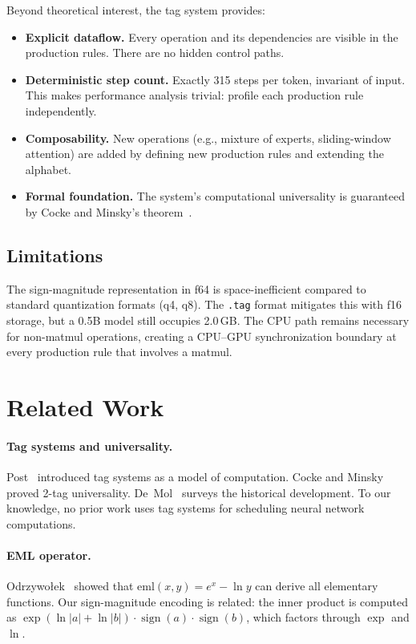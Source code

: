 \documentclass[acmsmall,nonacm]{acmart}
\begin{document}
Beyond theoretical interest, the tag system provides:
\begin{itemize}
\item \textbf{Explicit dataflow.}  Every operation and its
  dependencies are visible in the production rules.  There are no
  hidden control paths.
\item \textbf{Deterministic step count.}  Exactly 315 steps per
  token, invariant of input.  This makes performance analysis
  trivial: profile each production rule independently.
\item \textbf{Composability.}  New operations (e.g., mixture of
  experts, sliding-window attention) are added by defining new
  production rules and extending the alphabet.
\item \textbf{Formal foundation.}  The system's computational
  universality is guaranteed by Cocke and Minsky's
  theorem~\cite{cocke1964}.
\end{itemize}

\subsection{Limitations}

The sign-magnitude representation in f64 is space-inefficient
compared to standard quantization formats (q4, q8).  The
\texttt{.tag} format mitigates this with f16 storage, but a 0.5B
model still occupies 2.0\,GB.  The CPU path remains necessary for
non-matmul operations, creating a CPU--GPU synchronization boundary
at every production rule that involves a matmul.


\section{Related Work}
\label{sec:related}

\paragraph{Tag systems and universality.}
Post~\cite{post1943} introduced tag systems as a model of
computation.  Cocke and Minsky~\cite{cocke1964} proved 2-tag
universality.  De~Mol~\cite{demol2008} surveys the historical
development.  To our knowledge, no prior work uses tag systems
for scheduling neural network computations.

\paragraph{EML operator.}
Odrzywołek~\cite{odrzywolek2026} showed that
$\mathrm{eml}(x,y) = e^x - \ln y$ can derive all elementary
functions.  Our sign-magnitude encoding is related: the inner
product is computed as $\exp(\ln|a| + \ln|b|) \cdot \operatorname{sign}(a)
\cdot \operatorname{sign}(b)$, which factors through $\exp$ and $\ln$.
\end{document}
